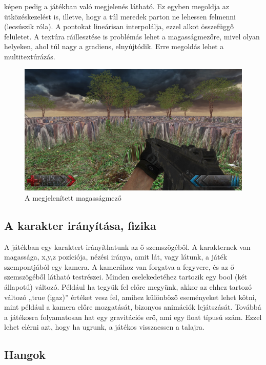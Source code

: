  képen pedig a játékban való megjelenés látható. Ez egyben megoldja az ütközéskezelést is, illetve, hogy a túl meredek parton ne lehessen felmenni (lecsúszik róla). A pontokat lineárisan interpolálja, ezzel alkot összefüggő felületet. A textúra ráillesztése is problémás lehet a magasságmezőre, mivel olyan helyeken, ahol túl nagy a gradiens, elnyújtódik. Erre megoldás lehet a multitextúrázás.

\begin{figure}[h]
\centering
\includegraphics[scale=0.4]{kepek/screenshot.png}
\caption{A megjelenített magasságmező}
\label{fig:screenshot}
\end{figure}

\subsection{A karakter irányítása, fizika}

A játékban egy karaktert irányíthatunk az ő szemszögéből. A karakternek van magassága, x,y,z pozíciója, nézési iránya, amit lát, vagy látunk, a játék szempontjából egy kamera. A kamerához van forgatva a fegyvere, és az ő szemszögéből látható testrészei. Minden cselekedetéhez tartozik egy bool (két állapotú) változó. Például ha tegyük fel előre megyünk, akkor az ehhez tartozó változó „true (igaz)” értéket vesz fel, amihez különböző eseményeket lehet kötni, mint például a kamera előre mozgatását, bizonyos animációk lejátszását. Továbbá a játékosra folyamatosan hat egy gravitációs erő, ami egy float típusú szám. Ezzel lehet elérni azt, hogy ha ugrunk, a játékos visszaessen a talajra.

\subsection{Hangok}

